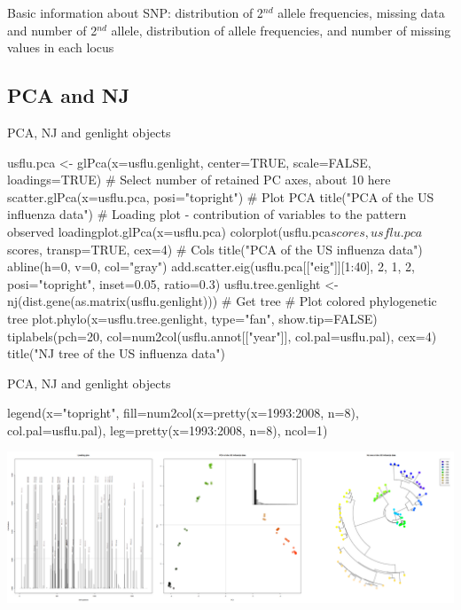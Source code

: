 \documentclass[compress, xelatex, 11pt, xcolor=svgnames, aspectratio=169,
	hyperref={
		bookmarks=true,
		unicode=true,
		colorlinks=true,
		pdftitle={Molecular data in R},
		plainpages=false,
		pdfauthor={Vojtech Zeisek},
		pdfsubject={Course about phylogeny and evolution in R},
		pdfcreator={XeLaTeX},
		pdfkeywords={R, evolution, phylogeny, molecular data},
		linkcolor=Crimson, %
		anchorcolor=Magenta, %
		citecolor=Magenta, %
		filecolor=Magenta, %
		menucolor=Magenta, %
		urlcolor=DodgerBlue, %
		},
	url={hyphens, lowtilde} %
	]{beamer}
\renewcommand{\texttt}[1]{\colorbox{Beige}{{\ttfamily #1}}}
\begin{document}
\begin{frame}{Basic information about SNP: distribution of 2$^{nd}$ allele frequencies, missing data and number of 2$^{nd}$ allele, distribution of allele frequencies, and number of missing values in each locus}
	\begin{center}
		\texttt{[image: flu\_alleles.png]}
	\end{center}
\end{frame}

\subsection{PCA and NJ}

\begin{frame}[fragile]{PCA, NJ and genlight objects}
	\begin{spluscode}
    usflu.pca <- glPca(x=usflu.genlight, center=TRUE, scale=FALSE,
      loadings=TRUE) # Select number of retained PC axes, about 10 here
    scatter.glPca(x=usflu.pca, posi="topright") # Plot PCA
    title("PCA of the US influenza data")
    # Loading plot - contribution of variables to the pattern observed
    loadingplot.glPca(x=usflu.pca)
    colorplot(usflu.pca$scores, usflu.pca$scores, transp=TRUE, cex=4) # Cols
    title("PCA of the US influenza data")
    abline(h=0, v=0, col="gray")
    add.scatter.eig(usflu.pca[["eig"]][1:40], 2, 1, 2, posi="topright",
      inset=0.05, ratio=0.3)
    usflu.tree.genlight <- nj(dist.gene(as.matrix(usflu.genlight))) # Get tree
    # Plot colored phylogenetic tree
    plot.phylo(x=usflu.tree.genlight, type="fan", show.tip=FALSE)
    tiplabels(pch=20, col=num2col(usflu.annot[["year"]], col.pal=usflu.pal),
      cex=4)
    title("NJ tree of the US influenza data")
	\end{spluscode}
\end{frame}

\begin{frame}[fragile]{PCA, NJ and genlight objects}
	\begin{spluscode}
    legend(x="topright", fill=num2col(x=pretty(x=1993:2008, n=8),
      col.pal=usflu.pal), leg=pretty(x=1993:2008, n=8), ncol=1)
	\end{spluscode}
	\begin{center}
		\includegraphics[width=\textwidth]{flu_pcoa_nj.png}
	\end{center}
\end{frame}
\end{document}
